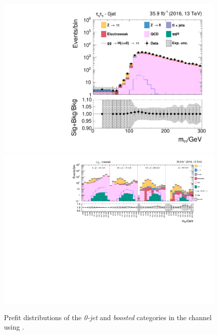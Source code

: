 \begin{figure}[h!]
    \centering
        \includegraphics[width=.5\textwidth]{Figures/statana/Postfit_JEC_jdphi/prefit_htt_tt_1_13TeV.pdf}\\
        \includegraphics[width=\textwidth]{Figures/statana/Postfit_JEC_jdphi/prefit_htt_tt_2_13TeV.pdf}
        \caption{Prefit distributions of the \textit{0-jet} and \textit{boosted} categories in the \tautau{} channel  using \jdphi{}.}
\end{figure}
